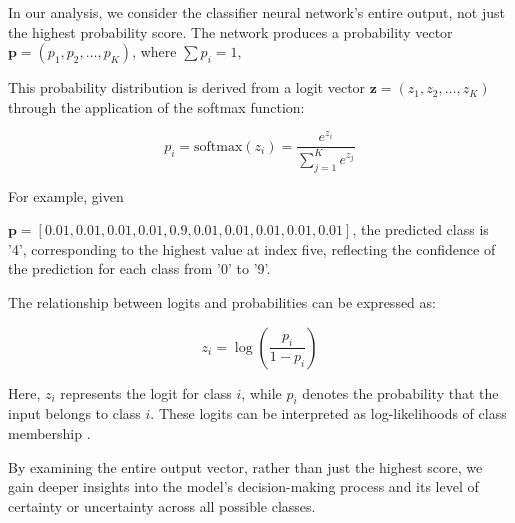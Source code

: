 
In our analysis, we consider the classifier neural network's entire output, not just the highest probability score. The network produces a probability vector $\mathbf{p} = (p_1, p_2, \dots, p_K)$, where $\sum p_i = 1$,

This probability distribution is derived from a logit vector $\mathbf{z} = (z_1, z_2, \dots, z_K)$ through the application of the softmax function:

\begin{equation}
p_i = \text{softmax}(z_i) = \frac{e^{z_i}}{\sum_{j=1}^{K} e^{z_j}}
\end{equation}

For example, given 

$\mathbf{p} = [0.01, 0.01, 0.01, 0.01, 0.9, 0.01, 0.01, 0.01, 0.01, 0.01]$, the predicted class is '4', corresponding to the highest value at index five, reflecting the confidence of the prediction for each class from '0' to '9'.

The relationship between logits and probabilities can be expressed as:

\begin{equation}
z_i = \log \left(\frac{p_i}{1 - p_i}\right)
\end{equation}

Here, $z_i$ represents the logit for class $i$, while $p_i$ denotes the probability that the input belongs to class $i$. These logits can be interpreted as log-likelihoods of class membership \cite{goodfellow2016deep, bishop2006pattern}.

By examining the entire output vector, rather than just the highest score, we gain deeper insights into the model's decision-making process and its level of certainty or uncertainty across all possible classes.

